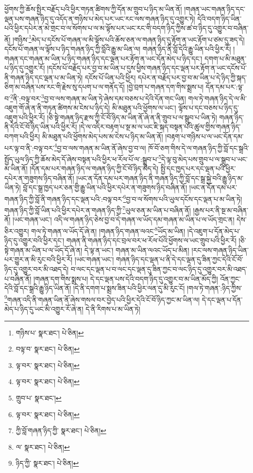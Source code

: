ཕྱོགས་ཀྱི་ཆོས་སྤྱིར་བརྗོད་པའི་ཕྱིར་གཏན་ཚིགས་ཀྱི་དོན་མ་གྲུབ་པ་ཉིད་མ་ཡིན་ནོ། །གཞན་ཡང་གཞན་ཉིད་དང་ལྡན་པས་གཞན་ཉིད་དུ་འདོད་ན་གཉིས་པ་མེད་པར་ཡང་རང་ལས་གཞན་ཉིད་དུ་འགྱུར་ཏེ། དེའི་བདག་ཉིད་ཡིན་པའི་ཕྱིར་དཔེར་ན་མེ་གྲང་བ་ལ་སོགས་པ་ལ་མ་ལྟོས་པར་ཡང་རང་གི་བདག་ཉིད་ཀྱིས་ཚ་བ་ཉིད་དུ་འགྱུར་བ་བཞིན་ནོ། །གཉིས་\footnote{གཉིས་པ་  སྣར་ཐང་།  པེ་ཅིན། }མེད་པ་དངོས་པོ་གཞན་ལ་མི་ལྟོས་པའི་ཆོས་ཅན་ལ་གཞན་ཉིད་དུ་རྟོག་ན་ཡང་རྟོག་པ་ཙམ་དུ་ཟད་དེ། དངོས་པོ་གཞན་ལ་ལྟོས་པ་ཉིད་གཞན་ཉིད་ཀྱི་བློའི་རྒྱུ་མ་ཡིན་ལ། གཞན་ཉིད་ནི་བློ་དེའི་རྒྱུ་ཡིན་པའི་ཕྱིར་རོ། །གཞན་དང་གཞན་མ་ཡིན་པ་ཉིད་གཞན་ཉིད་དང་ལྡན་པར་རྟོག་ན་ཡང་དོན་མེད་པ་ཉིད་དང་། དགག་པ་མི་མཐུན་པ་ཉིད་དུ་འགྱུར་རོ། །དངོས་པོ་བརྗོད་པར་བྱ་བ་མ་ཡིན་པ་དུས་ཕྱིས་གཞན་ཉིད་དང་ལྡན་པར་རྟོག་ན་ཡང་དངོས་པོ་ནི་གཞན་ཉིད་དང་ལྡན་པ་མ་ཡིན་ཏེ། དངོས་པོ་ཡིན་པའི་ཕྱིར། དཔེར་ན་བརྗོད་པར་བྱ་བ་མ་ཡིན་པ་དེ་ཉིད་ཀྱི་སྐད་ཅིག་མ་བཞིན་པས་རང་གི་རྗེས་སུ་དཔག་པ་ལ་གནོད་དོ། །བྱེ་བྲག་པ་གཞན་དག་གིས་སྨྲས་པ། དོན་དམ་པར་:ལྟ་བ་\footnote{བལྟ་བ་  སྣར་ཐང་།  པེ་ཅིན། }ནི་:བལྟ་བར་\footnote{ལྟ་བར་  སྣར་ཐང་།  པེ་ཅིན། }བྱ་བ་ལས་གཞན་མ་ཡིན་ཏེ་ཞེས་དམ་བཅས་པ་དེའི་དོན་གང་ཡིན། གལ་ཏེ་གཞན་ཉིད་དེ་ལ་མི་འཇུག་གོ་ཞེ་ན་ནི་གཏན་ཚིགས་མ་ངེས་པ་ཉིད་དེ། མི་མཐུན་པའི་ཕྱོགས་ལ་ཡང་། ལྟོས་པ་དང་བཅས་པ་ཉིད་དུ་འཇུག་པའི་ཕྱིར་རོ། །ཅི་སྟེ་གཞན་ཉིད་རྫས་ཀྱི་ངོ་བོ་ཉིད་མ་ཡིན་ནོ་ཞེ་ན་ནི་གྲུབ་པ་ལ་སྒྲུབ་པ་ཡིན་ཏེ། གཞན་ཉིད་ནི་དེའི་ངོ་བོ་ཉིད་ཡིན་པའི་ཕྱིར་རོ། །དེ་ལ་འདིར་བརྟག་པ་སྔ་མ་ལ་ཡང་ཇི་སྐད་བསྟན་པའི་ཚུལ་གྱིས་གཞན་ཉིད་བཀག་པའི་ཕྱིར། མི་མཐུན་པའི་ཕྱོགས་མེད་པས་མ་ངེས་པ་ཉིད་མ་ཡིན་ནོ། །བརྟག་པ་གཉིས་པ་ལ་ཡང་དོན་དམ་པར་ལྟ་བ་ནི་:བལྟ་བར་\footnote{ལྟ་བར་  སྣར་ཐང་།  པེ་ཅིན། }བྱ་བ་ལས་གཞན་མ་ཡིན་ནོ་ཞེས་བྱ་བ་ལ། ཁོ་བོ་ཅག་གིས་དེ་ལ་གཞན་ཉིད་ཀྱི་བློ་དང་སྒྲའི་སྤྱོད་ཡུལ་ཉིད་ཀྱི་ཆོས་མེད་དོ་ཞེས་བསྟན་པའི་ཕྱིར་ཕ་རོལ་པོ་ལ་:སྒྲུབ་པ་\footnote{གྲུབ་པ་  སྣར་ཐང་། }དེ་ལྟ་བུ་མེད་པས་གྲུབ་པ་ལ་སྒྲུབ་པ་ཡང་མ་ཡིན་ནོ། །དོན་དམ་པར་གཞན་ཉིད་ལ་གཞན་ཉིད་ཀྱི་ངོ་བོ་ཉིད་མེད་དེ། སྤྱི་དང་ཁྱད་པར་དང་ལྡན་པའི་ཕྱིར་དཔེར་ན་གཟུགས་ཉིད་བཞིན་ནོ། །ཡང་ན་དོན་དམ་པར་གཞན་ཉིད་ནི་གཞན་ཉིད་ཀྱི་བློ་དང་སྒྲ་སྐྱེ་བའི་རྒྱུ་ཉིད་མ་ཡིན་ཏེ། བློ་དང་སྒྲ་ཁྱད་པར་ཅན་གྱི་རྒྱུ་ཡིན་པའི་ཕྱིར་དཔེར་ན་གཟུགས་ཉིད་བཞིན་ནོ། །ཡང་ན་དོན་དམ་པར་གཞན་ཉིད་ཀྱི་བློ་ནི་གཞན་ཉིད་དང་ལྡན་པའི་:བལྟ་བར་\footnote{ལྟ་བར་  སྣར་ཐང་།  པེ་ཅིན། }བྱ་བ་ལ་སོགས་པའི་ཡུལ་དངོས་དང་ལྡན་པ་མ་ཡིན་ཏེ། གཞན་ཉིད་ཀྱི་བློ་ཡིན་པའི་ཕྱིར་དཔེར་ན་གཞན་ཉིད་ཀྱི་\footnote{ཀྱི་བློ་གཞན་ཉིད་ཀྱི་  སྣར་ཐང་།  པེ་ཅིན། }ཡུལ་ཅན་མ་ཡིན་པ་བཞིན་ནོ། །རྒྱས་པར་ནི་སྔ་མ་བཞིན་ནོ། །ཡང་གཞན་ཡང་། འདི་ལ་གཞན་ཉིད་ཅེས་བྱ་བ་དེ་གཞན་ལ་ཡོད་དམ་གཞན་མ་ཡིན་པ་ལ་ཡོད་གྲང་ན། དེས་ཅིར་འགྱུར། གལ་ཏེ་གཞན་ལ་ཡོད་དོ་ཞེ་ན། །གཞན་ཉིད་གཞན་ལའང་\footnote{ལ་  སྣར་ཐང་།  པེ་ཅིན། }ཡོད་མ་ཡིན། །དེ་འཇུག་པ་དོན་མེད་པ་ཉིད་དུ་འགྱུར་བའི་ཕྱིར་དང་། གཞན་ནི་གཞན་ཉིད་དང་བྲལ་བར་ཕ་རོལ་པོའི་ཕྱོགས་ལ་ཡང་གྲུབ་པའི་ཕྱིར་རོ། །ཅི་སྟེ་གཞན་མ་ཡིན་པ་ལ་ཡོད་དོ་ཞེ་ན། དེ་ལྟ་ན་ཡང་། གཞན་མ་ཡིན་ལའང་ཡོད་པ་མིན། །རང་ལས་གཞན་ཉིད་ཡིན་པར་གྱུར་ན་མི་རུང་བའི་ཕྱིར་རོ། །ཡང་གཞན་ཡང་། གཞན་ཉིད་དང་ལྡན་པ་ནི་དེ་དང་ལྡན་དུ་ཟིན་ཀྱང་དེའི་ངོ་བོ་ཉིད་དུ་འགྱུར་བར་མི་འཐད་དེ། བ་ལང་དང་ལྡན་པ་བ་ལང་དང་ལྡན་དུ་ཟིན་ཀྱང་བ་ལང་ཉིད་དུ་འགྱུར་བར་མི་འཐད་པ་བཞིན་ནོ། །གཞན་དག་གིས་སྨྲས་པ། དེ་དང་ལྡན་པས་དེའི་བདག་ཉིད་དུ་འགྱུར་བ་མ་ཡིན་མོད་ཀྱི། འོན་ཀྱང་དེའི་བློ་དང་སྒྲའི་རྒྱུ་ཉིད་ཡིན་ནོ། །དེ་ནི་དགག་པ་སྨྲས་ཟིན་པའི་ཕྱིར་ལན་དུ་མི་རུང་ངོ། །གལ་ཏེ་གཞན་:ཉིད་ཀྱིས་\footnote{ཉིད་ཀྱི་  སྣར་ཐང་།  པེ་ཅིན། }གཞན་འདི་ནི་གཞན་ཡིན་ནོ་ཞེས་གསལ་བར་བྱེད་པའི་ཕྱིར་དེའི་ངོ་བོ་ཉིད་ཀྱང་མ་ཡིན་ལ། དེ་དང་ལྡན་པ་དོན་མེད་པ་ཉིད་དུ་ཡང་མི་འགྱུར་རོ་ཞེ་ན། དེ་ནི་རིགས་པ་མ་ཡིན་ཏེ། 
